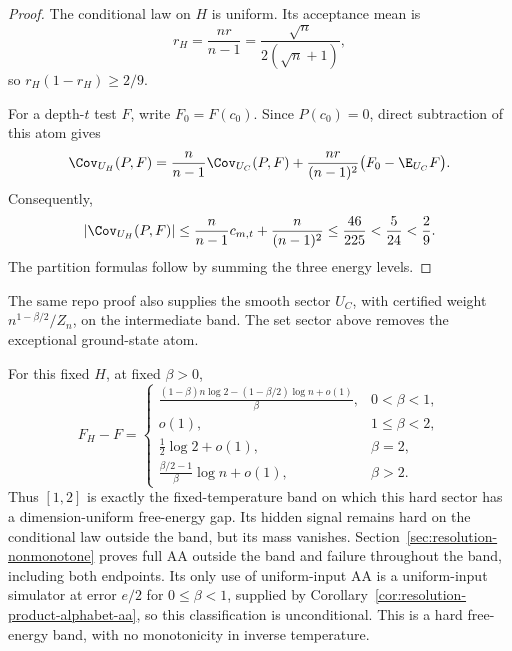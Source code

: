 \begin{proof}
The conditional law on \(H\) is uniform. Its acceptance mean is
\[
 r_H=\frac{nr}{n-1}
 =\frac{\sqrt n}{2(\sqrt n+1)},
\]
so \(r_H(1-r_H)\ge2/9\).

For a depth-\(t\) test \(F\), write \(F_0=F(c_0)\). Since
\(P(c_0)=0\), direct subtraction of this atom gives
\[
 \Cov_{U_H}(P,F)
 =\frac n{n-1}\Cov_{U_C}(P,F)
 +\frac{nr}{(n-1)^2}\bigl(F_0-\E_{U_C}F\bigr).
\]
Consequently,
\[
 |\Cov_{U_H}(P,F)|
 \le\frac n{n-1}c_{m,t}+\frac n{(n-1)^2}
 \le\frac{46}{225}<\frac5{24}<\frac29.
\]
The partition formulas follow by summing the three energy levels.
\end{proof}

The same repo proof also supplies the smooth sector \(U_C\), with
certified weight \(n^{1-\beta/2}/Z_n\), on the intermediate band.
The set sector above removes the exceptional ground-state atom.

For this fixed \(H\), at fixed \(\beta>0\),
\[
 F_H-F=
 \begin{cases}
 \displaystyle
 \frac{(1-\beta)n\log2-(1-\beta/2)\log n+o(1)}{\beta},
       &0<\beta<1,\\[2mm]
 o(1),&1\le\beta<2,\\
 \frac12\log2+o(1),&\beta=2,\\
 \displaystyle\frac{\beta/2-1}{\beta}\log n+o(1),
       &\beta>2.
 \end{cases}
\]
Thus \([1,2]\) is exactly the fixed-temperature band on which this
hard sector has a dimension-uniform free-energy gap. Its hidden signal
remains hard on the conditional law outside the band, but its mass
vanishes. Section~\ref{sec:resolution-nonmonotone} proves full AA
outside the band and failure throughout the band, including both
endpoints. Its only use of uniform-input AA is a uniform-input
simulator at error \(e/2\) for \(0\le\beta<1\), supplied by
Corollary~\ref{cor:resolution-product-alphabet-aa}, so this
classification is unconditional. This is a hard free-energy band, with
no monotonicity in inverse temperature.

